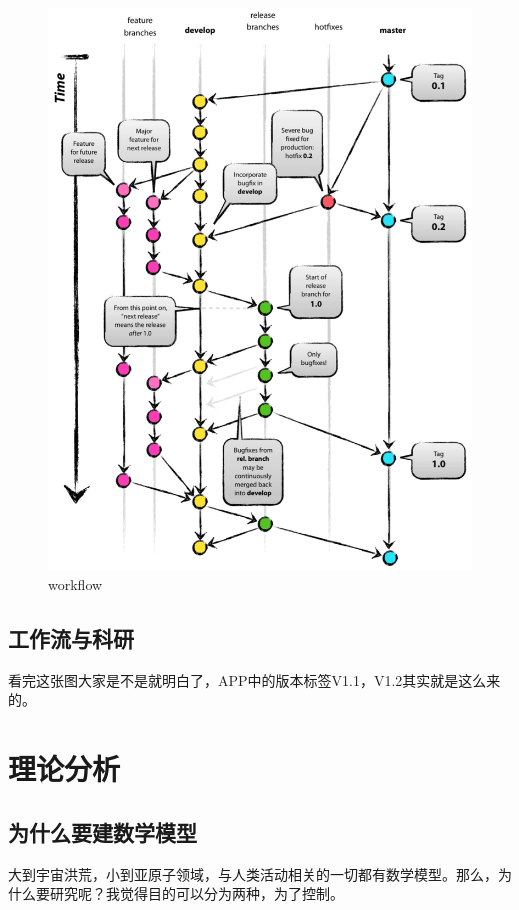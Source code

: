 \documentclass[UTF8]{ctexbook}
\begin{document}
\begin{figure}[!htb]
	\centering
	\includegraphics[width=1\linewidth]{Figure/workflow.pdf}
	\vspace{-0.3cm}
	\caption{workflow}\label{fig:workflow}
\end{figure}

\subsection{工作流与科研}
看完这张图大家是不是就明白了，APP中的版本标签V1.1，V1.2其实就是这么来的。

\section{理论分析}
\subsection{为什么要建数学模型}
大到宇宙洪荒，小到亚原子领域，与人类活动相关的一切都有数学模型。那么，为什么要研究呢？我觉得目的可以分为两种，为了控制。
\end{document}
